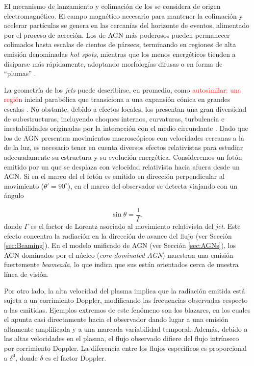 	El mecanismo de lanzamiento y colimación de los \jets se considera de origen electromagnético.
	El campo magnético necesario para mantener la colimación y acelerar partículas se genera en las cercanías del horizonte de eventos, alimentado por el proceso de acreción.
	Los \jets de AGN más poderosos pueden permanecer colimados hasta escalas de cientos de pársecs, terminando en regiones de alta emisión denominadas \textit{hot spots}, mientras que los menos energéticos tienden a disiparse más rápidamente, adoptando morfologías difusas o en forma de ``plumas'' \citep{Fanaroff1974,Blandford2019}.

	La geometría de los \textit{jets} puede describirse, en promedio, como \textcolor{red}{autosimilar: una región} inicial parabólica que transiciona a una expansión cónica en grandes escalas \citep[e.g.,][]{Blandford1982,Li1992}.
	No obstante, debido a efectos locales, los \jets presentan una gran diversidad de subestructuras, incluyendo choques internos, curvaturas, turbulencia e inestabilidades originadas por la interacción con el medio circundante \citep{Hardee2011,Perucho2012}. 
	Dado que los \jets de AGN presentan movimientos macroscópicos con velocidades cercanas a la de la luz, es necesario tener en cuenta diversos efectos relativistas para estudiar adecuadamente su estructura y su evoluci\'on energética. 
	Consideremos un fotón emitido por un \jet que se desplaza con velocidad relativista hacia afuera desde un AGN. Si en el marco del \jet el fotón es emitido en dirección perpendicular al movimiento ($\theta' = 90^\circ$), en el marco del observador se detecta viajando con un ángulo

\begin{equation}\label{eq:marco-1}
    \sin\theta = \frac{1}{\Gamma},
\end{equation}
donde $\Gamma$ es el factor de Lorentz asociado al movimiento relativista del \textit{jet}.
	Este efecto concentra la radiación en la dirección de avance del flujo (ver Secci\'on \ref{sec:Beaming}).
	En el modelo unificado de AGN (ver Sección \ref{sec:AGNs}), los AGN dominados por el núcleo (\textit{core-dominated AGN}) muestran una emisión fuertemente \textit{beameada}, lo que indica que sus \jets están orientados cerca de nuestra línea de visión.
	
	Por otro lado, la alta velocidad del plasma implica que la radiación emitida está sujeta a un corrimiento Doppler, modificando las frecuencias observadas respecto a las emitidas. Ejemplos extremos de este fenómeno son los blazares, en los cuales el \jet apunta casi directamente hacia el observador dando lugar a una emisión altamente amplificada y a una marcada variabilidad temporal.
	Adem\'as, debido a las altas velocidades en el plasma, el flujo observado difiere del flujo intrínseco por corrimiento Doppler. La diferencia entre los flujos especificos es proporcional a $\delta^{4}$, donde $\delta$ es el factor Doppler.
	
